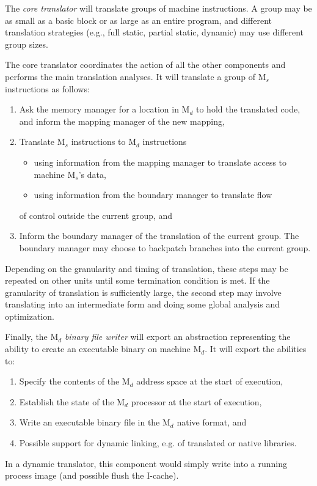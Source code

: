 The \emph{core translator} will translate groups of machine instructions.
A group may be as small as a basic block or as large as an entire 
program, and different translation strategies (e.g., full static, 
partial static, dynamic) may use different group sizes.

The core translator coordinates the action of all the other
components and performs the main translation analyses.  It will 
translate a group of M$_s$ instructions as follows:
\begin{enumerate}
\item Ask the memory manager for a location in M$_d$ to hold the translated
     code, and inform the mapping manager of the new mapping, 
\item Translate M$_s$ instructions to M$_d$ instructions
	  \begin{itemize}
      \item using information from the mapping manager to translate
         access to machine M$_s$'s data, 
      \item using information from the boundary manager to translate flow
	  \end{itemize}
	 of control outside the current group, and
\item Inform the boundary manager of the translation of the current group.
     The boundary manager may choose to backpatch branches into the
     current group.
\end{enumerate}
Depending on the granularity and timing of translation, these steps may
be repeated on other units until some termination condition is met.
If the granularity of translation is sufficiently large, the second step
may involve translating into an intermediate form and doing some global
analysis and optimization.

Finally, the M$_d$ \emph{binary file writer} will export an abstraction
representing the ability to create an executable binary on machine M$_d$.
It will export the abilities to:
\begin{enumerate}
\item Specify the contents of the M$_d$ address space at the start of
     execution,
\item Establish the state of the M$_d$ processor at the start of execution,
\item Write an executable binary file in the M$_d$ native format, and
\item Possible support for dynamic linking, e.g. of translated or native
     libraries.
\end{enumerate}
In a dynamic translator, this component would simply write into a
running process image (and possible flush the I-cache).


